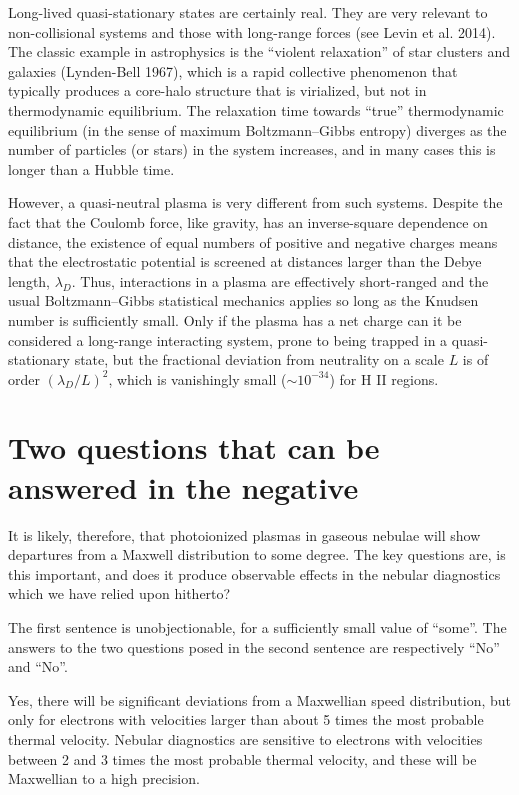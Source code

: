 \documentclass[11pt]{article}
\renewenvironment{quote}{\begin{shaded*}\small\sffamily}{\end{shaded*}}
\begin{document}
Long-lived quasi-stationary states are certainly real.  They are very relevant to non-collisional systems and those with long-range forces (see Levin et al. 2014).  The classic example in astrophysics is the ``violent relaxation'' of star clusters and galaxies (Lynden-Bell 1967), which is a rapid collective phenomenon that typically produces a core-halo structure that is virialized, but not in thermodynamic equilibrium. The relaxation time towards ``true'' thermodynamic equilibrium (in the sense of maximum Boltzmann--Gibbs entropy) diverges as the number of particles (or stars) in the system increases, and in many cases this is longer than a Hubble time. 

However, a quasi-neutral plasma is very different from such systems.  Despite the fact that the Coulomb force, like gravity, has an inverse-square dependence on distance, the existence of equal numbers of positive and negative charges means that the electrostatic potential is screened at distances larger than the Debye length, \(\lambda_{D}\).  Thus, interactions in a plasma are effectively short-ranged and the usual Boltzmann--Gibbs statistical mechanics applies so long as the Knudsen number is sufficiently small.  Only if the plasma has a net charge can it be considered a long-range interacting system, prone to being trapped in a quasi-stationary state, but the fractional deviation from neutrality on a scale \(L\) is of order \((\lambda_{D}/L)^{2}\), which is vanishingly small (\(\sim 10^{-34}\)) for H II regions. 

\section*{Two questions that can be answered in the negative}
\label{sec:orgheadline7}
\begin{quote}
It is likely, therefore, that photoionized plasmas in gaseous nebulae will show departures from a Maxwell distribution to some degree. The key questions are, is this important, and does it produce observable effects in the nebular diagnostics which we have relied upon hitherto?
\end{quote}

The first sentence is unobjectionable, for a sufficiently small value of ``some''.  The answers to the two questions posed in the second sentence are respectively ``No'' and ``No''.  

Yes, there will be significant deviations from a Maxwellian speed distribution, but only for electrons with velocities larger than about 5 times the most probable thermal velocity.  Nebular diagnostics are sensitive to electrons with velocities between 2 and 3 times the most probable thermal velocity, and these will be Maxwellian to a high precision. 
\end{document}
